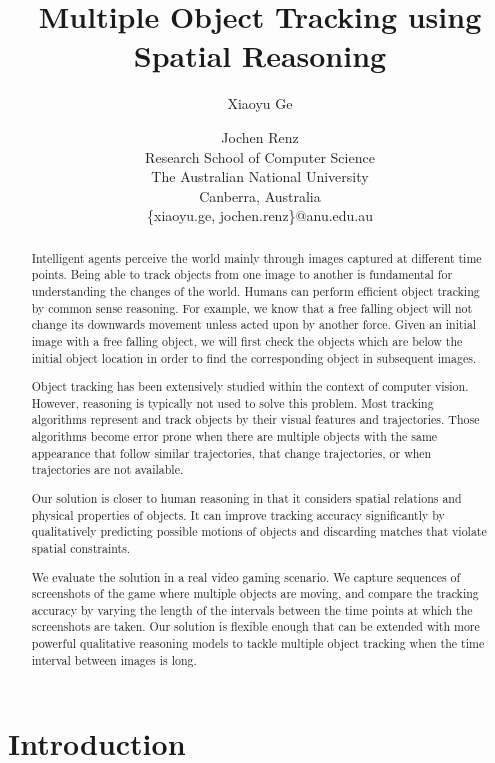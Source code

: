 \documentclass[letterpaper]{article}
\title{Multiple Object Tracking using Spatial Reasoning}
\author{Xiaoyu Ge \and Jochen Renz \\
Research School of Computer Science\\
The Australian National University \\
Canberra, Australia\\
\{xiaoyu.ge, jochen.renz\}@anu.edu.au
}
\begin{document}
\maketitle    
\begin{abstract}
Intelligent agents perceive the world mainly through images captured at  different time points. Being able to track objects from one image to another is fundamental for understanding the changes of the world. 
Humans can perform efficient object tracking by common sense reasoning. For example, we know that a free falling object will not change its downwards movement unless acted upon by another force. Given an initial image with a free falling object, we will first check the objects which are below the initial object location in order to find the corresponding object in subsequent images. 

Object tracking has been extensively studied within the context of computer vision. However, reasoning is typically not used to solve this problem. Most tracking algorithms represent and track objects by their visual features and trajectories. Those algorithms become error prone when there are multiple objects with the same appearance that follow similar trajectories, that change trajectories, or when trajectories are not available. 


Our solution is closer to human reasoning in that it considers spatial relations and physical properties of objects. It can improve tracking accuracy significantly by qualitatively predicting possible motions of objects and discarding matches that violate spatial constraints. 

We evaluate the solution in a real video gaming scenario. We capture sequences of screenshots of the game where multiple objects are moving, and compare the tracking accuracy by varying the length of the intervals between the time points at which the screenshots are taken. Our solution is flexible enough that can be extended with more powerful qualitative reasoning models to tackle multiple object tracking when the time interval between images is long. 
\end{abstract}
\section{Introduction}
\end{document}

